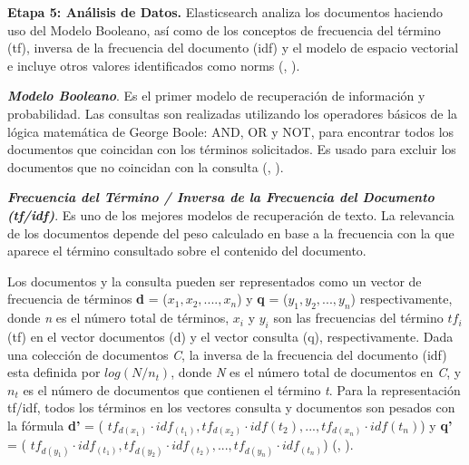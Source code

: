 
\textbf{Etapa 5: Análisis de Datos.}
Elasticsearch analiza los documentos haciendo uso del Modelo Booleano, así como de los conceptos de frecuencia del término (tf), inversa de la frecuencia del documento (idf) y el modelo de espacio vectorial e incluye otros valores identificados como norms (\citeauthor{Gormley}, \citeyear{Gormley}).

\textit{\textbf{Modelo Booleano}}. Es el primer modelo de recuperación de información y probabilidad. Las consultas son realizadas utilizando los operadores básicos de la lógica matemática de George Boole: AND, OR y NOT, para encontrar todos los documentos que coincidan con los términos solicitados. Es usado para excluir los documentos que no coincidan con la consulta (\citeauthor{modelos_recuperacion_info}, \citeyear{modelos_recuperacion_info}).

\textit{\textbf{Frecuencia del Término / Inversa de la Frecuencia del Documento (tf/idf)}}. Es uno de los mejores modelos de recuperación de texto. La relevancia de los documentos depende del peso calculado en base a la frecuencia con la que aparece el término consultado sobre el contenido del documento.

Los documentos y la consulta pueden ser representados como un vector de frecuencia de términos \textbf{d} =  (${x_1, x_2,....,x_n}$) y \textbf{q} = (${y_1, y_2,...,y_n}$) respectivamente, donde \textit{n} es el número total de términos, ${x_i}$ y ${y_i}$ son las frecuencias del término $tf_i$ (tf) en el vector documentos (d) y el vector consulta (q), respectivamente. Dada una colección de documentos \textit{C}, la inversa de la frecuencia del documento (idf) esta definida por $log(N/n_t)$, donde \textit{N} es el número total de documentos en \textit{C}, y $n_t$ es el número de documentos que contienen el término \textit{t}. Para la representación tf/idf, todos los términos en los vectores consulta y documentos son pesados con la fórmula \textbf{d'} = ( $tf_{d(x_1)}\cdot idf_{(t_1)}, tf_{d(x_2)}\cdot idf(t_2),..., tf_{d(x_n)}\cdot idf(t_n)$) y \textbf{q'} = ( $tf_{d(y_1)}\cdot idf_{(t_1)}, tf_{d(y_2)}\cdot idf_{(t_2)},..., tf_{d(y_n)}\cdot idf_{(t_n)}$) (\citeauthor{modelo_tf_idf}, \citeyear{modelo_tf_idf}).

